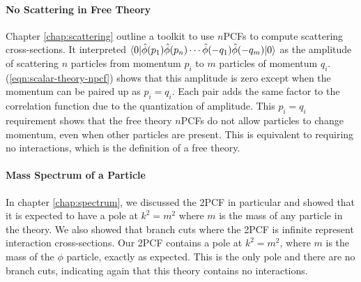 \paragraph*{No Scattering in Free Theory}
Chapter \ref{chap:scattering} outline a toolkit to use $n$PCFs to compute scattering cross-sections. It interpreted $\braket{0|\hat\phi(p_1)\hat\phi(p_n)\cdots\hat\phi(-q_1)\hat\phi(-q_m)|0}$ as the amplitude of scattering $n$ particles from momentum $p_i$ to $m$ particles of momentum $q_i$. (\ref{eqn:scalar-theory-npcf}) shows that this amplitude is zero except when the momentum can be paired up as $p_i = q_i$. Each pair adds the same factor to the correlation function due to the quantization of amplitude. This $p_i = q_i$ requirement shows that the free theory $n$PCFs do not allow particles to change momentum, even when other particles are present. This is equivalent to requiring no interactions, which is the definition of a free theory.

\paragraph*{Mass Spectrum of a Particle}
In chapter \ref{chap:spectrum}, we discussed the 2PCF in particular and showed that it is expected to have a pole at $k^2 = m^2$ where $m$ is the mass of any particle in the theory. We also showed that branch cuts where the 2PCF is infinite represent interaction cross-sections. Our 2PCF contains a pole at $k^2 = m^2$, where $m$ is the mass of the $\phi$ particle, exactly as expected. This is the only pole and there are no branch cuts, indicating again that this theory contains no interactions.

